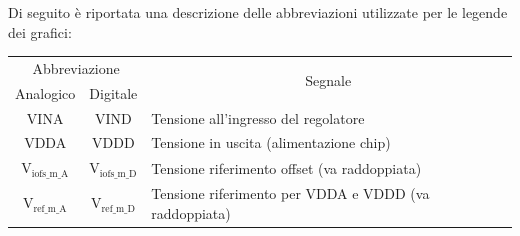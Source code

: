 Di seguito è riportata una descrizione delle abbreviazioni utilizzate per le legende dei grafici:

\begin{center}
\begin{tabularx}{\linewidth}{|cc|X|}
\hline
\multicolumn{2}{|c|}{Abbreviazione} & \multicolumn{1}{c|}{\multirow{2}{*}{Segnale}}\\ 
Analogico & Digitale & \\
\hline
VINA & VIND & Tensione all'ingresso del regolatore  \\ \hline
VDDA & VDDD & Tensione in uscita (alimentazione chip) \\ \hline
$\mathrm{V_{iofs \_ m \_ A}}$ & $\mathrm{V_{iofs \_ m \_ D}}$ & Tensione riferimento offset (va raddoppiata) \\ \hline   
$\mathrm{V_{ref \_ m \_ A}}$ & $\mathrm{V_{ref \_ m \_ D}}$ & Tensione riferimento per VDDA e VDDD (va raddoppiata)\\ \hline   
\end{tabularx}
\end{center}

